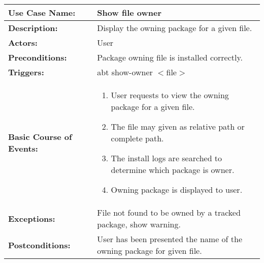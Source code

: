 
\begin{tabularx}{\linewidth}{|l|X|}
\hline
\textbf{Use Case Name:} & \textbf{Show file owner} \\
\hline
\textbf{Description:} & Display the owning package for a given file. \\
\hline
\textbf{Actors:} & User \\
\hline
\textbf{Preconditions:} & Package owning file is installed correctly. \\
\hline
\textbf{Triggers:} & abt show-owner $<$file$>$ \\
\hline
\textbf{Basic Course of Events:} & 
\begin{minipage}{\linewidth} 
  \vspace{0.05em}
  \begin{enumerate}
    \item User requests to view the owning package for a given file.
    \item The file may given as relative path or complete path.
    \item The install logs are searched to determine which package is owner.
    \item Owning package is displayed to user.
  \end{enumerate}
  \vspace{0.05em}
\end{minipage}
\\
\hline 
\textbf{Exceptions:} & File not found to be owned by a tracked package, show warning. \\
\hline 
\textbf{Postconditions:} &
User has been presented the name of the owning package for given file. \\
\hline
\end{tabularx}


